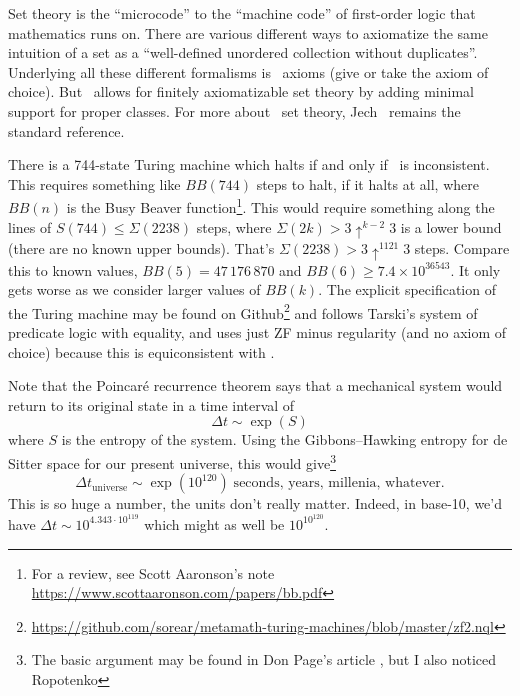 \begin{node}\label{set-0000}%
Set theory is the ``microcode'' to the ``machine code'' of first-order
logic that mathematics runs on. There are various different ways to
axiomatize the same intuition of a set as a ``well-defined unordered
collection without duplicates''. Underlying all these different
formalisms is \ZFC\ axioms (give or take the axiom of choice). But
\NBG\ allows for finitely axiomatizable set theory by adding minimal
support for proper classes. For more about \ZFC\ set theory,
Jech~\cite{jech2003set} remains the standard reference.
\end{node}

\begin{node}\label{set-0002}%
There is a 744-state Turing machine which halts if and only if \ZFC\ is
inconsistent. This requires something like $BB(744)$ steps to halt, if
it halts at all, where $BB(n)$ is the Busy Beaver function\footnote{For
a review, see Scott Aaronson's note \url{https://www.scottaaronson.com/papers/bb.pdf}}.
This would require something along the lines of
$S(744)\leq\Sigma(2238)$ steps, where $\Sigma(2k)>3\uparrow^{k-2}3$ is a
lower bound (there are no known upper bounds). That's
$\Sigma(2238)>3\uparrow^{1121}3$ steps. Compare this to known values, $BB(5)=47\,176\,870$
and $BB(6)\geq 7.4\times 10^{36543}$. It only gets worse as we consider
larger values of $BB(k)$. The explicit specification of the Turing
machine may be found on Github\footnote{\url{https://github.com/sorear/metamath-turing-machines/blob/master/zf2.nql}}
and follows Tarski's system of predicate logic with equality, and uses
just ZF minus regularity (and no axiom of choice) because this is
equiconsistent with \ZFC.

Note that the Poincar\'e recurrence theorem says that a mechanical
system would return to its original state in a time interval of
\begin{equation}
\Delta t\sim\exp(S)
\end{equation}
where $S$ is the entropy of the system. Using the Gibbons--Hawking
entropy for de Sitter space for our present universe, this would
give\footnote{The basic argument may be found in Don Page's article
, but I also noticed Ropotenko }
\begin{equation}\label{eq:set:poincare-period-of-universe}
\Delta t_{\text{universe}}\sim\exp(10^{120})\;\mbox{seconds, years,
  millenia, whatever}.
\end{equation}
This is so huge a number, the units don't really matter. Indeed, in
base-10, we'd have $\Delta t\sim 10^{4.343\cdot 10^{119}}$ which might
as well be $10^{10^{120}}$.
\end{node}

